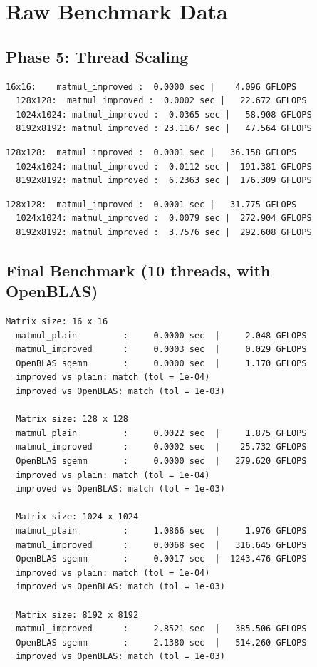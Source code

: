 \appendix
\section{Raw Benchmark Data}

\subsection{Phase 5: Thread Scaling}

\begin{lstlisting}[language={},caption={1 thread}]
  16x16:    matmul_improved :  0.0000 sec |    4.096 GFLOPS
  128x128:  matmul_improved :  0.0002 sec |   22.672 GFLOPS
  1024x1024: matmul_improved :  0.0365 sec |   58.908 GFLOPS
  8192x8192: matmul_improved : 23.1167 sec |   47.564 GFLOPS
\end{lstlisting}

\begin{lstlisting}[language={},caption={4 threads (P-cores only)}]
  128x128:  matmul_improved :  0.0001 sec |   36.158 GFLOPS
  1024x1024: matmul_improved :  0.0112 sec |  191.381 GFLOPS
  8192x8192: matmul_improved :  6.2363 sec |  176.309 GFLOPS
\end{lstlisting}

\begin{lstlisting}[language={},caption={10 threads (all cores)}]
  128x128:  matmul_improved :  0.0001 sec |   31.775 GFLOPS
  1024x1024: matmul_improved :  0.0079 sec |  272.904 GFLOPS
  8192x8192: matmul_improved :  3.7576 sec |  292.608 GFLOPS
\end{lstlisting}

\subsection{Final Benchmark (10 threads, with OpenBLAS)}

\begin{lstlisting}[language={},caption={Final benchmark output}]
  Matrix size: 16 x 16
  matmul_plain         :     0.0000 sec  |     2.048 GFLOPS
  matmul_improved      :     0.0003 sec  |     0.029 GFLOPS
  OpenBLAS sgemm       :     0.0000 sec  |     1.170 GFLOPS
  improved vs plain: match (tol = 1e-04)
  improved vs OpenBLAS: match (tol = 1e-03)

  Matrix size: 128 x 128
  matmul_plain         :     0.0022 sec  |     1.875 GFLOPS
  matmul_improved      :     0.0002 sec  |    25.732 GFLOPS
  OpenBLAS sgemm       :     0.0000 sec  |   279.620 GFLOPS
  improved vs plain: match (tol = 1e-04)
  improved vs OpenBLAS: match (tol = 1e-03)

  Matrix size: 1024 x 1024
  matmul_plain         :     1.0866 sec  |     1.976 GFLOPS
  matmul_improved      :     0.0068 sec  |   316.645 GFLOPS
  OpenBLAS sgemm       :     0.0017 sec  |  1243.476 GFLOPS
  improved vs plain: match (tol = 1e-04)
  improved vs OpenBLAS: match (tol = 1e-03)

  Matrix size: 8192 x 8192
  matmul_improved      :     2.8521 sec  |   385.506 GFLOPS
  OpenBLAS sgemm       :     2.1380 sec  |   514.260 GFLOPS
  improved vs OpenBLAS: match (tol = 1e-03)
\end{lstlisting}

